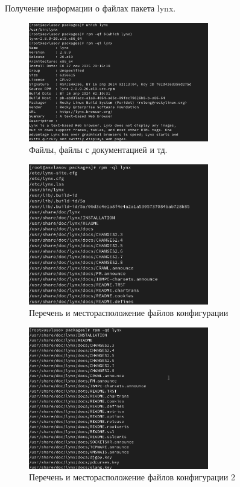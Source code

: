 \documentclass[
  12pt,
  a4paper,
  DIV=11,
  numbers=noendperiod]{scrreprt}
\begin{document}
Получение информации о файлах пакета lynx.

\begin{figure}

{\centering \includegraphics[width=0.7\textwidth,height=\textheight]{image/15.png}

}

\caption{Файлы, файлы с документацией и тд.}

\end{figure}%
\begin{figure}

{\centering \includegraphics[width=0.7\textwidth,height=\textheight]{image/16.png}

}

\caption{Перечень и месторасположение файлов конфигурации}

\end{figure}%
\begin{figure}

{\centering \includegraphics[width=0.7\textwidth,height=\textheight]{image/17.png}

}

\caption{Перечень и месторасположение файлов конфигурации 2}

\end{figure}%
\end{document}
